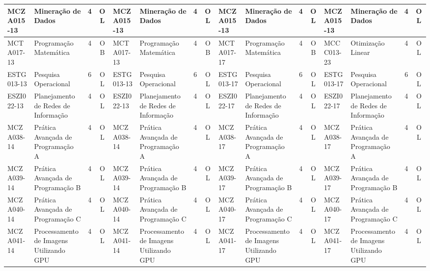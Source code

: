 \documentclass[a4paper]{article}
\begin{document}
\begin{landscape}
{\begin{longtable}{|l|p{.15\textheight}|c|c||l|p{.15\textheight}|c|c||l|p{.15\textheight}|c|c||l|p{.15\textheight}|c|c|}
    MCZA015-13 & Mineração de Dados & 4 & OL &
    MCZA015-13 & Mineração de Dados & 4 & OL &
    MCZA015-13 & Mineração de Dados & 4 & OL &
    MCZA015-13 & Mineração de Dados & 4 & OL \\ \hline

    MCTA017-13 & Programação Matemática & 4 & OB &
    MCTA017-13 & Programação Matemática & 4 & OB &
    MCTA017-17 & Programação Matemática & 4 & OB &
    MCCC013-23 & Otimização Linear & 4 & OL\\ \hline

    ESTG013-13 & Pesquisa Operacional & 6 & OL &
    ESTG013-13 & Pesquisa Operacional & 6 & OL &
    ESTG013-17 & Pesquisa Operacional & 6 & OL &
    ESTG013-17 & Pesquisa Operacional & 6 & OL \\ \hline
    
    ESZI022-13 & Planejamento de Redes de Informação & 4 & OL &
    ESZI022-13 & Planejamento de Redes de Informação & 4 & OL &
    ESZI022-17 & Planejamento de Redes de Informação & 4 & OL &
    ESZI022-17 & Planejamento de Redes de Informação & 4 & OL \\ \hline
    
    MCZA038-14 & Prática Avançada de Programação A & 4 & OL &
    MCZA038-14 & Prática Avançada de Programação A & 4 & OL &
    MCZA038-17 & Prática Avançada de Programação A & 4 & OL &
    MCZA038-17 & Prática Avançada de Programação A & 4 & OL \\ \hline
    
    MCZA039-14 & Prática Avançada de Programação B & 4 & OL &
    MCZA039-14 & Prática Avançada de Programação B & 4 & OL &
    MCZA039-17 & Prática Avançada de Programação B & 4 & OL & 
    MCZA039-17 & Prática Avançada de Programação B & 4 & OL \\ \hline
    
    MCZA040-14 & Prática Avançada de Programação C & 4 & OL &
    MCZA040-14 & Prática Avançada de Programação C & 4 & OL &
    MCZA040-17 & Prática Avançada de Programação C & 4 & OL &
    MCZA040-17 & Prática Avançada de Programação C & 4 & OL \\ \hline
    
    MCZA041-14 & Processamento de Imagens Utilizando GPU & 4 & OL &
    MCZA041-14 & Processamento de Imagens Utilizando GPU & 4 & OL &
    MCZA041-17 & Processamento de Imagens Utilizando GPU & 4 & OL & 
    MCZA041-17 & Processamento de Imagens Utilizando GPU & 4 & OL \\ \hline
    

\end{longtable}}
\end{landscape}
\end{document}
